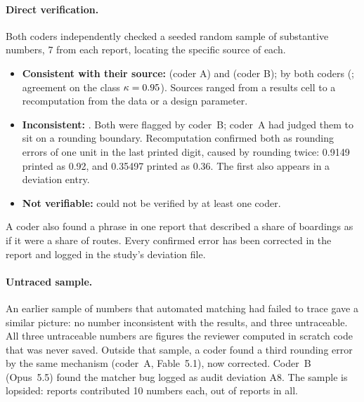 \paragraph{Direct verification.} Both coders independently checked a seeded random sample of \VerifyN{} substantive
numbers, 7 from each report, locating the specific source of each.
\begin{itemize}
\item \textbf{Consistent with their source:} \VerifyOKA{} (coder A) and \VerifyOKB{} (coder B); \VerifyOKBoth{} by
both coders (\VerifyCIOKBoth{}; agreement on the class $\kappa=0.95{}$). Sources ranged from a results cell to a recomputation from the data or a design
parameter.
\item \textbf{Inconsistent:} \VerifyFourEither{}. Both were flagged by coder~B; coder~A had judged them to sit on a
rounding boundary. Recomputation confirmed both as rounding errors of one unit in the last printed digit, caused by
rounding twice: 0.9149 printed as 0.92, and 0.35497 printed as 0.36. The first also appears in a deviation entry.
\item \textbf{Not verifiable:} \VerifyFiveEither{} could not be verified by at least one coder.
\end{itemize}
A coder also found a phrase in one report that described a share of boardings as if it were a share of routes. Every
confirmed error has been corrected in the report and logged in the study's deviation file.

\paragraph{Untraced sample.} An earlier sample of \UntracedN{} numbers that automated matching had failed to trace
gave a similar picture: no number inconsistent with the results, and three untraceable. All three untraceable numbers
are figures the reviewer computed in scratch code that was never saved. Outside that sample, a coder found a third
rounding error by the same mechanism (coder~A, Fable~5.1), now corrected. Coder~B (Opus~5.5) found the matcher bug
logged as audit deviation A8. The sample is lopsided: \SampleReportsTen{} reports contributed
10 numbers each, out of \SampleReports{} reports in all.


